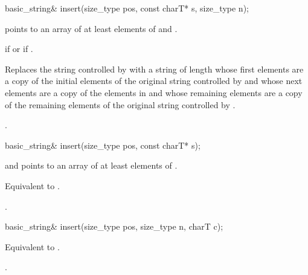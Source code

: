 %
%
\begin{itemdecl}
basic_string&
  insert(size_type pos, const charT* s, size_type n);
\end{itemdecl}

\begin{itemdescr}
\pnum
\requires {} points to an array of at least 
elements of  and .

\pnum
\throws {} if  or 
if .

\pnum
\effects Replaces the string controlled by  with a string of
length  whose first  elements are a copy of
the initial elements of the original string controlled by  and
whose next  elements are a copy of the elements in  and
whose remaining elements are a copy of the remaining elements of the original
string controlled by .

\pnum
\returns
{}.
\end{itemdescr}

%
%
\begin{itemdecl}
basic_string&
  insert(size_type pos, const charT* s);
\end{itemdecl}

\begin{itemdescr}
\pnum
\requires {} and  points to an array of at least
 elements of .

\pnum
\effects Equivalent to .

\pnum
\returns
{}.
\end{itemdescr}

%
%
\begin{itemdecl}
basic_string&
  insert(size_type pos, size_type n, charT c);
\end{itemdecl}

\begin{itemdescr}
\pnum
\effects Equivalent to .

\pnum
\returns
{}.
\end{itemdescr}

